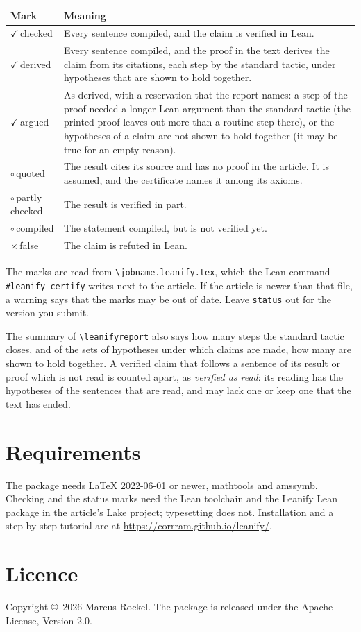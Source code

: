 \documentclass[11pt]{article}
\newcommand*\pkg[1]{\textsf{#1}}
\newcommand*\opt[1]{\texttt{#1}}
\newcommand*\cs[1]{\texttt{\textbackslash#1}}
\begin{document}
\medskip
\noindent\begin{tabularx}{\linewidth}{@{}l X@{}}
\toprule
Mark & Meaning \\
\midrule
$\checkmark$\,\textsf{checked} & Every sentence compiled, and the claim is verified in Lean. \\
$\checkmark$\,\textsf{derived} & Every sentence compiled, and the proof in the text
  derives the claim from its citations, each step by the standard tactic, under
  hypotheses that are shown to hold together. \\
$\checkmark$\,\textsf{argued} & As \textsf{derived}, with a reservation that the
  report names: a step of the proof needed a longer Lean argument than the standard
  tactic (the printed proof leaves out more than a routine step there), or the
  hypotheses of a claim are not shown to hold together (it may be true for an empty
  reason). \\
$\circ$\,\textsf{quoted} & The result cites its source and has no proof in the
  article. It is assumed, and the certificate names it among its axioms. \\
$\circ$\,\textsf{partly checked} & The result is verified in part. \\
$\circ$\,\textsf{compiled} & The statement compiled, but is not verified yet. \\
$\times$\,\textsf{false} & The claim is refuted in Lean. \\
\bottomrule
\end{tabularx}

\medskip
The marks are read from \texttt{\cs{jobname}.leanify.tex}, which the Lean command
\texttt{\#leanify\_certify} writes next to the article. If the article is newer
than that file, a warning says that the marks may be out of date. Leave
\opt{status} out for the version you submit.

The summary of \cs{leanifyreport} also says how many steps the standard tactic
closes, and of the sets of hypotheses under which claims are made, how many are
shown to hold together. A verified claim that follows a sentence of its result or
proof which is not read is counted apart, as \emph{verified as read}: its reading
has the hypotheses of the sentences that are read, and may lack one or keep one
that the text has ended.

\section{Requirements}

The package needs LaTeX 2022-06-01 or newer, \pkg{mathtools} and \pkg{amssymb}.
Checking and the status marks need the Lean toolchain and the Leanify Lean
package in the article's Lake project; typesetting does not. Installation and
a step-by-step tutorial are at \url{https://corrram.github.io/leanify/}.

\section{Licence}

Copyright \copyright\ 2026 Marcus Rockel. The package is released under the
Apache License, Version 2.0.
\end{document}
